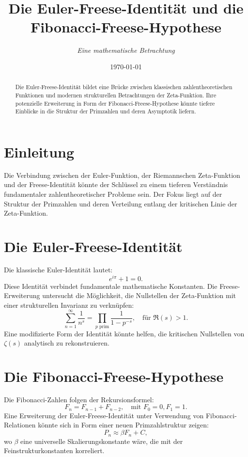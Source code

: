 \documentclass[a4paper,12pt]{article}
\title{Die Euler-Freese-Identität und die Fibonacci-Freese-Hypothese}
\author{\textit{Eine mathematische Betrachtung}}
\date{\today}
\begin{document}
\maketitle

\begin{abstract}
Die Euler-Freese-Identität bildet eine Brücke zwischen klassischen zahlentheoretischen Funktionen und modernen strukturellen Betrachtungen der Zeta-Funktion. Ihre potenzielle Erweiterung in Form der Fibonacci-Freese-Hypothese könnte tiefere Einblicke in die Struktur der Primzahlen und deren Asymptotik liefern.
\end{abstract}

\section{Einleitung}
Die Verbindung zwischen der Euler-Funktion, der Riemannschen Zeta-Funktion und der Freese-Identität könnte der Schlüssel zu einem tieferen Verständnis fundamentaler zahlentheoretischer Probleme sein. Der Fokus liegt auf der Struktur der Primzahlen und deren Verteilung entlang der kritischen Linie der Zeta-Funktion.

\section{Die Euler-Freese-Identität}
Die klassische Euler-Identität lautet:
\begin{equation}
    e^{i\pi} + 1 = 0.
\end{equation}
Diese Identität verbindet fundamentale mathematische Konstanten. Die Freese-Erweiterung untersucht die Möglichkeit, die Nullstellen der Zeta-Funktion mit einer strukturellen Invarianz zu verknüpfen:
\begin{equation}
    \sum_{n=1}^{\infty} \frac{1}{n^s} = \prod_{p \text{ prim}} \frac{1}{1 - p^{-s}}, \quad \text{für } \Re(s) > 1.
\end{equation}
Eine modifizierte Form der Identität könnte helfen, die kritischen Nullstellen von $\zeta(s)$ analytisch zu rekonstruieren.

\section{Die Fibonacci-Freese-Hypothese}
Die Fibonacci-Zahlen folgen der Rekursionsformel:
\begin{equation}
    F_n = F_{n-1} + F_{n-2}, \quad \text{mit } F_0 = 0, F_1 = 1.
\end{equation}
Eine Erweiterung der Euler-Freese-Identität unter Verwendung von Fibonacci-Relationen könnte sich in Form einer neuen Primzahlstruktur zeigen:
\begin{equation}
    P_n \approx \beta F_n + C,
\end{equation}
wo $\beta$ eine universelle Skalierungskonstante wäre, die mit der Feinstrukturkonstanten korreliert.
\end{document}
